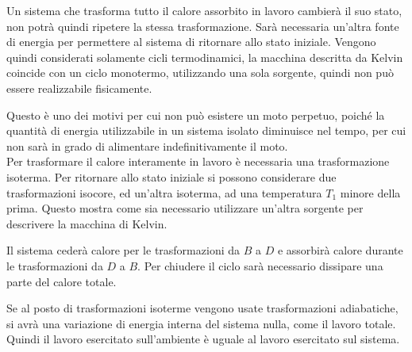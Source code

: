\documentclass{article}
\numberwithin{equation}{subsection}
\begin{document}
Un sistema che trasforma tutto il calore assorbito in lavoro 
cambierà il suo stato, non potrà quindi ripetere 
la stessa trasformazione. Sarà necessaria un'altra fonte di 
energia per permettere al sistema di ritornare allo stato iniziale. 
Vengono quindi considerati solamente cicli termodinamici, la macchina descritta da Kelvin coincide con un ciclo monotermo, utilizzando una sola sorgente, quindi non può 
essere realizzabile fisicamente. 


Questo è uno dei motivi per cui non può esistere un moto 
perpetuo, poiché la quantità di energia utilizzabile in un sistema isolato diminuisce nel tempo, per cui non sarà in grado di alimentare 
indefinitivamente il moto. 
\\ 
Per trasformare il calore interamente in lavoro è necessaria una trasformazione 
isoterma. Per ritornare allo stato iniziale si possono considerare 
due trasformazioni isocore, ed un'altra isoterma, ad una temperatura $T_1$ 
minore della prima. Questo mostra come sia necessario utilizzare un'altra sorgente per descrivere la macchina di Kelvin. 

\begin{center}\end{center}

Il sistema cederà calore per le trasformazioni da $B$ a $D$ e 
assorbirà calore durante le trasformazioni da $D$ a $B$. 
Per chiudere il ciclo sarà necessario dissipare una parte del 
calore totale. 


Se al posto di trasformazioni isoterme vengono 
usate trasformazioni adiabatiche, si avrà una variazione 
di energia interna del sistema nulla, come il lavoro totale. 
Quindi il lavoro esercitato sull'ambiente è uguale al lavoro 
esercitato sul sistema. 
\end{document}
